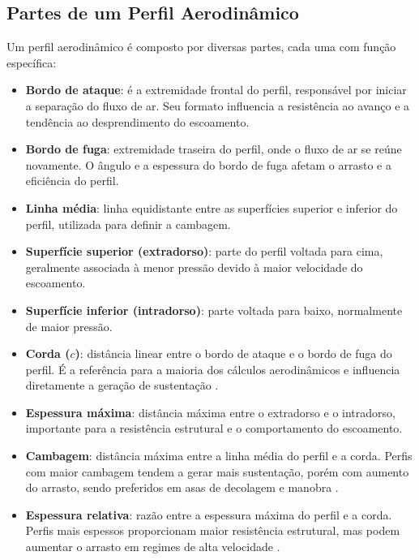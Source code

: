 \subsection{Partes de um Perfil Aerodinâmico}
Um perfil aerodinâmico é composto por diversas partes, cada uma com função específica:

\begin{itemize}
    \item \textbf{Bordo de ataque}: é a extremidade frontal do perfil, responsável por iniciar a separação do fluxo de ar. Seu formato influencia a resistência ao avanço e a tendência ao desprendimento do escoamento.
    \item \textbf{Bordo de fuga}: extremidade traseira do perfil, onde o fluxo de ar se reúne novamente. O ângulo e a espessura do bordo de fuga afetam o arrasto e a eficiência do perfil.
    \item \textbf{Linha média}: linha equidistante entre as superfícies superior e inferior do perfil, utilizada para definir a cambagem.
    \item \textbf{Superfície superior (extradorso)}: parte do perfil voltada para cima, geralmente associada à menor pressão devido à maior velocidade do escoamento.
    \item \textbf{Superfície inferior (intradorso)}: parte voltada para baixo, normalmente de maior pressão.
    \item \textbf{Corda (\(c\))}: distância linear entre o bordo de ataque e o bordo de fuga do perfil. É a referência para a maioria dos cálculos aerodinâmicos e influencia diretamente a geração de sustentação \cite{anderson2017fundamentals}.
    \item \textbf{Espessura máxima}: distância máxima entre o extradorso e o intradorso, importante para a resistência estrutural e o comportamento do escoamento.
    \item \textbf{Cambagem}: distância máxima entre a linha média do perfil e a corda. Perfis com maior cambagem tendem a gerar mais sustentação, porém com aumento do arrasto, sendo preferidos em asas de decolagem e manobra \cite{abbott1959theory}.
    \item \textbf{Espessura relativa}: razão entre a espessura máxima do perfil e a corda. Perfis mais espessos proporcionam maior resistência estrutural, mas podem aumentar o arrasto em regimes de alta velocidade \cite{anderson2017fundamentals}.
\end{itemize}

